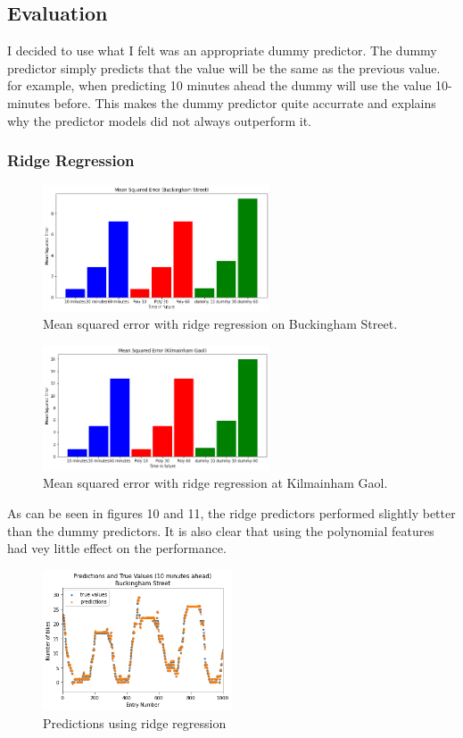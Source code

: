 \subsection{Evaluation}
I decided to use what I felt was an appropriate dummy predictor.
The dummy predictor simply predicts that the value will be the same as the previous value.
for example, when predicting 10 minutes ahead the dummy will use the value 10-minutes before.
This makes the dummy predictor quite accurrate and explains why the predictor models did not always outperform it.
\subsubsection{Ridge Regression}
\begin{figure}[H]
    \centering
    \includegraphics[width=0.6\textwidth]{images/mse1.png}
    \caption{Mean squared error with ridge regression on Buckingham Street.}
    \end{figure}
\par
\begin{figure}[H]
    \centering
    \includegraphics[width=0.6\textwidth]{images/mse2.png}
    \caption{Mean squared error with ridge regression at Kilmainham Gaol.}
    \end{figure}
\par

As can be seen in figures 10 and 11, 
the ridge predictors performed slightly better than the dummy predictors.
It is also clear that using the polynomial features had vey little effect on the performance.
\begin{figure}[H]
    \centering
    \includegraphics[width=0.5\textwidth]{images/preds1.png}
    \caption{Predictions using ridge regression}
    \end{figure}
\par

